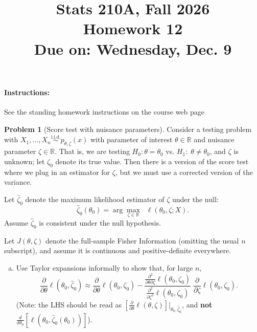 \documentclass{article}
\newcommand{\RR}{\mathbb{R}}
\newcommand{\simiid}{\overset{\text{i.i.d.}}{\sim}}
\theoremstyle{definition}
\newtheorem{problem}{Problem}
\begin{document}
\title{Stats 210A, Fall 2026\\
  Homework 12 \\
  {\large {\bf Due on}: Wednesday, Dec. 9}}
\date{}

\maketitle

\paragraph{Instructions:} See the standing homework instructions on the course web page




\begin{problem}[Score test with nuisance parameters]
\label{prob:score-nuisance}
Consider a testing problem with $X_1,\ldots,X_n \simiid p_{\theta,\zeta}(x)$ with parameter of interest $\theta \in \RR$ and nuisance parameter $\zeta\in \RR$. That is, we are testing $H_0:\theta = \theta_0$ vs. $H_1:\; \theta \neq \theta_0$, and $\zeta$ is unknown; let $\zeta_0$ denote its true value. Then there is a version of the score test where we plug in an estimator for $\zeta$, but we must use a corrected version of the variance.

Let $\hat\zeta_0$ denote the maximum likelihood estimator of $\zeta$ under the null:
\[
\hat\zeta_0(\theta_0) = \arg\max_{\zeta\in\RR} \;\;\ell(\theta_0,\zeta; X).
\]
Assume $\hat\zeta_0$ is consistent under the null hypothesis.

Let $J(\theta,\zeta)$ denote the full-sample Fisher Information (omitting the usual $n$ subscript), and assume it is continuous and positive-definite everywhere.

\begin{enumerate}[(a)]
\item Use Taylor expansions informally to show that, for large $n$,
\[
\frac{\partial}{\partial\theta} \ell(\theta_0,\hat\zeta_0)
\approx \frac{\partial}{\partial\theta}\ell(\theta_0,\zeta_0)
- \frac{\frac{\partial^2}{\partial\theta\partial\zeta} \ell(\theta_0,\zeta_0)}
{\frac{\partial^2}{\partial\zeta^2} \ell(\theta_0,\zeta_0)} \;\frac{\partial}{\partial\zeta} \ell(\theta_0,\zeta_0).
\]
(Note: the LHS should be read as $[\frac{\partial}{\partial\theta} \ell(\theta,\zeta)]\big|_{\theta_0,\hat\zeta_0}$, and {\bf not} $\frac{d}{d\theta_0} [\ell(\theta_0,\hat\zeta_0(\theta_0))]$).





\end{enumerate}
\end{problem}
\end{document}
